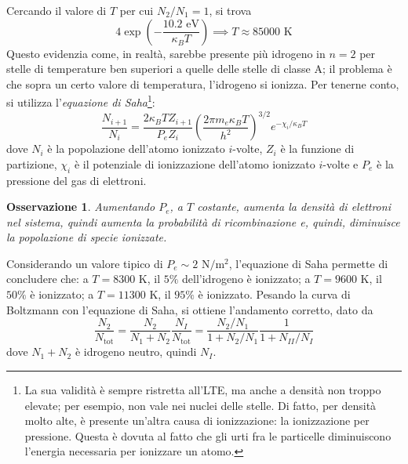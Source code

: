 \documentclass[11pt, a4paper]{scrartcl}
\theoremstyle{style}
\newtheorem{osservazione}{Osservazione}[section]
\theoremstyle{style1}
\numberwithin{equation}{subsection}
\begin{document}
\noindent Cercando il valore di $T$ per cui $N_2 / N_1 =1$, si trova
\[
4 \exp \left(- \frac{10.2 \text{ eV}}{\kappa _B T}\right) \implies T \approx 85000\text{ K}
\] 
Questo evidenzia come, in realt\`a, sarebbe presente pi\`u idrogeno in $n=2$ per stelle di temperature ben superiori a quelle delle stelle di classe A; il problema \`e che sopra un certo valore di temperatura, l'idrogeno si ionizza. 
Per tenerne conto, si utilizza l'\textit{equazione di Saha}\footnote{La sua validit\`a \`e sempre ristretta all'LTE, ma anche a densit\`a non troppo elevate; per esempio, non vale nei nuclei delle stelle. Di fatto, per densit\`a molto alte, \`e presente un'altra causa di ionizzazione: la ionizzazione per pressione. Questa \`e dovuta al fatto che gli urti fra le particelle diminuiscono l'energia necessaria per ionizzare un atomo.}:
\[
\frac{N_{i+1} }{N_i} = \frac{2\kappa _B T Z_{i+1} }{P_e Z_i} \left(\frac{2\pi m_e\kappa _B T}{h^2}\right) ^{3 / 2} e^{- \chi _i /  \kappa _B T}
\] 
dove $N_{i} $ \`e la popolazione dell'atomo ionizzato $i$-volte, $Z_i$ \`e la funzione di partizione, $\chi _i$ \`e il potenziale di ionizzazione dell'atomo ionizzato $i$-volte e $P_e$ \`e la pressione del gas di elettroni.
\begin{osservazione}
Aumentando $P_e$, a $T$ costante, aumenta la densit\`a di elettroni nel sistema, quindi aumenta la probabilit\`a di ricombinazione e, quindi, diminuisce la popolazione di specie ionizzate.
\end{osservazione}
\noindent Considerando un valore tipico di $P_e \sim 2\text{ N}/\text{m}^2$, l'equazione di Saha permette di concludere che: a $T=8300$ K, il $5\%$ dell'idrogeno \`e ionizzato; a $T=9600$ K, il $50\%$ \`e ionizzato; a $T = 11300$ K, il $95\%$ \`e ionizzato. 
Pesando la curva di Boltzmann con l'equazione di Saha, si ottiene l'andamento corretto, dato da
\[
\frac{N_2}{N_\text{tot}} = \frac{N_2}{N_1+N_2} \frac{N_{I} }{N_\text{tot}} = \frac{N_2 / N_1}{ 1+ N_2 / N_1} \frac{1}{1 + N_{II}  / N_I}
\] 
dove $N_1 + N_2$ \`e idrogeno neutro, quindi $N_I$. 
\end{document}
